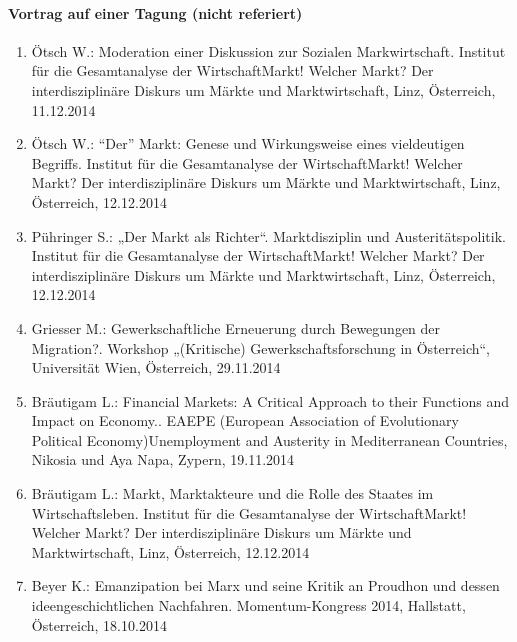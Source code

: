 \paragraph{Vortrag auf einer Tagung (nicht referiert)}
\begin{enumerate}
	\item Ötsch W.: Moderation einer Diskussion zur Sozialen Markwirtschaft. Institut für die Gesamtanalyse der WirtschaftMarkt! Welcher Markt? Der interdisziplinäre Diskurs um Märkte und Marktwirtschaft, Linz, Österreich, 11.12.2014
	\item Ötsch W.: “Der” Markt: Genese und Wirkungsweise eines vieldeutigen Begriffs. Institut für die Gesamtanalyse der WirtschaftMarkt! Welcher Markt? Der interdisziplinäre Diskurs um Märkte und Marktwirtschaft, Linz, Österreich, 12.12.2014
	\item Pühringer S.: „Der Markt als Richter“. Marktdisziplin und Austeritätspolitik. Institut für die Gesamtanalyse der WirtschaftMarkt! Welcher Markt? Der interdisziplinäre Diskurs um Märkte und Marktwirtschaft, Linz, Österreich, 12.12.2014
	\item Griesser M.: Gewerkschaftliche Erneuerung durch Bewegungen der Migration?. Workshop „(Kritische) Gewerkschaftsforschung in Österreich“, Universität Wien, Österreich, 29.11.2014
	\item Bräutigam L.: Financial Markets: A Critical Approach to their Functions and Impact on Economy.. EAEPE (European Association of Evolutionary Political Economy)Unemployment and Austerity in Mediterranean Countries, Nikosia und Aya Napa, Zypern, 19.11.2014
	\item Bräutigam L.: Markt, Marktakteure und die Rolle des Staates im Wirtschaftsleben. Institut für die Gesamtanalyse der WirtschaftMarkt! Welcher Markt? Der interdisziplinäre Diskurs um Märkte und Marktwirtschaft, Linz, Österreich, 12.12.2014
	\item Beyer K.: Emanzipation bei Marx und seine Kritik an Proudhon und dessen ideengeschichtlichen Nachfahren. Momentum-Kongress 2014, Hallstatt, Österreich, 18.10.2014
\end{enumerate}
